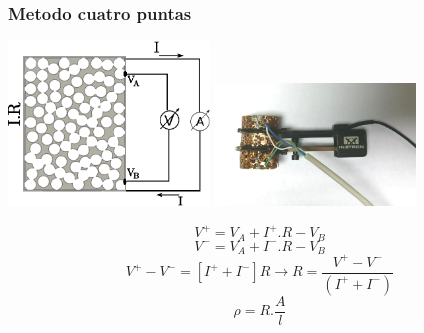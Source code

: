 \documentclass[usenames,dvipsnames]{beamer}
\begin{document}

\begin{frame}
\frametitle{Metodo cuatro puntas}

\includegraphics[width=0.4\textwidth]{img/resistencia/CuatroPuntas1.eps}
\includegraphics[width=0.4\textwidth]{img/resistencia/cpfoto.png}

\begin{equation*}
V^+= V_A +I^+ . R - V_B 
\end{equation*}
\begin{equation*}
 V^-= V_A +I^- . R - V_B 
\end{equation*}
\begin{equation*}
 V^+ - V^-= [I^+ + I^-] R \longrightarrow R=\frac{V^+ - V^-}{(I^+ + I^-)}
\end{equation*}
\begin{equation*}
 \rho = R . \frac{A}{l} \label{resist} 
\end{equation*}


\end{frame}
\end{document}
